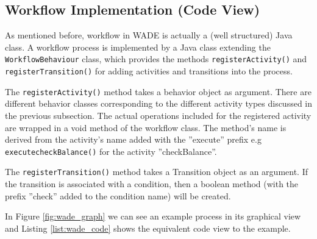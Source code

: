 \subsection{Workflow Implementation (Code View)}
As mentioned before, workflow in WADE is actually a (well structured) Java class. A workflow process is implemented by a Java class extending the \verb|WorkflowBehaviour| class, which provides the methods \verb|registerActivity()| and \verb|registerTransition()| for adding activities and transitions into the process. 

The \verb|registerActivity()| method takes a behavior object as argument. There are different behavior classes corresponding to the different activity types discussed in the previous subsection. The actual operations included for the registered activity are wrapped in a void method of the workflow class. The method's name is derived from the activity's name added with the ''execute'' prefix e.g \verb|executecheckBalance()| for the activity ''checkBalance''.  

The \verb|registerTransition()| method takes a Transition object as an argument. If the transition is associated with a condition, then a boolean method (with the prefix ''check'' added to the condition name) will be created.

In Figure \ref{fig:wade_graph} we can see an example process in its graphical view and Listing \ref{list:wade_code} shows the equivalent code view to the example. 

